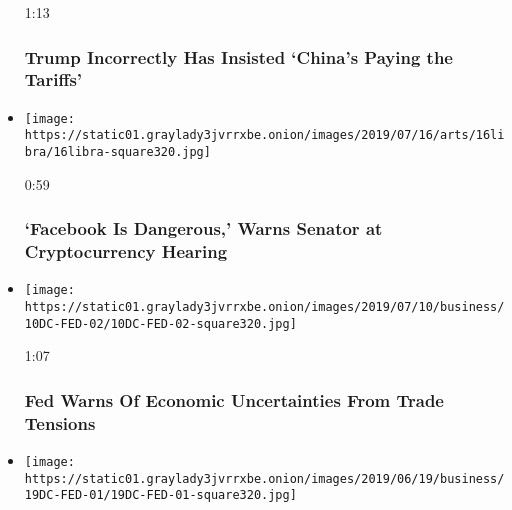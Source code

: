 \begin{itemize}
  1:13

  \hypertarget{trump-incorrectly-has-insisted-chinas-paying-the-tariffs}{%
  \subsubsection{Trump Incorrectly Has Insisted `China's Paying the
  Tariffs'}\label{trump-incorrectly-has-insisted-chinas-paying-the-tariffs}}
\item
  \href{https://www.nytimes3xbfgragh.onion/video/business/100000006614347/facebook-libra-senate.html?action=click\&module=video-series-bar\&region=header\&pgtype=Article\&playlistId=video/business}{}

  \texttt{[image: https://static01.graylady3jvrrxbe.onion/images/2019/07/16/arts/16libra/16libra-square320.jpg]}

  0:59

  \hypertarget{facebook-is-dangerous-warns-senator-at-cryptocurrency-hearing}{%
  \subsubsection{`Facebook Is Dangerous,' Warns Senator at
  Cryptocurrency
  Hearing}\label{facebook-is-dangerous-warns-senator-at-cryptocurrency-hearing}}
\item
  \href{https://www.nytimes3xbfgragh.onion/video/business/100000006604392/fed-powell-trade.html?action=click\&module=video-series-bar\&region=header\&pgtype=Article\&playlistId=video/business}{}

  \texttt{[image: https://static01.graylady3jvrrxbe.onion/images/2019/07/10/business/10DC-FED-02/10DC-FED-02-square320.jpg]}

  1:07

  \hypertarget{fed-warns-of-economic-uncertainties-from-trade-tensions}{%
  \subsubsection{Fed Warns Of Economic Uncertainties From Trade
  Tensions}\label{fed-warns-of-economic-uncertainties-from-trade-tensions}}
\item
  \href{https://www.nytimes3xbfgragh.onion/video/business/economy/100000006568107/fed-rates-powell.html?action=click\&module=video-series-bar\&region=header\&pgtype=Article\&playlistId=video/business}{}

  \texttt{[image: https://static01.graylady3jvrrxbe.onion/images/2019/06/19/business/19DC-FED-01/19DC-FED-01-square320.jpg]}


\end{itemize}
